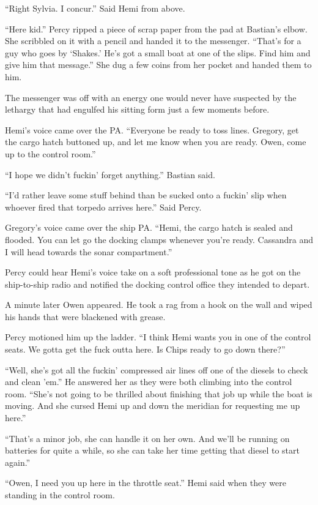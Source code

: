 \documentclass[
]{scrbook}
\begin{document}
``Right Sylvia. I concur.'' Said Hemi from above.

``Here kid.'' Percy ripped a piece of scrap paper from the pad at
Bastian's elbow. She scribbled on it with a pencil and handed it to the
messenger. ``That's for a guy who goes by `Shakes.' He's got a small
boat at one of the slips. Find him and give him that message.'' She dug
a few coins from her pocket and handed them to him.

The messenger was off with an energy one would never have suspected by
the lethargy that had engulfed his sitting form just a few moments
before.

Hemi's voice came over the PA. ``Everyone be ready to toss lines.
Gregory, get the cargo hatch buttoned up, and let me know when you are
ready. Owen, come up to the control room.''

``I hope we didn't fuckin' forget anything.'' Bastian said.

``I'd rather leave some stuff behind than be sucked onto a fuckin' slip
when whoever fired that torpedo arrives here.'' Said Percy.

Gregory's voice came over the ship PA. ``Hemi, the cargo hatch is sealed
and flooded. You can let go the docking clamps whenever you're ready.
Cassandra and I will head towards the sonar compartment.''

Percy could hear Hemi's voice take on a soft professional tone as he got
on the ship-to-ship radio and notified the docking control office they
intended to depart.

A minute later Owen appeared. He took a rag from a hook on the wall and
wiped his hands that were blackened with grease.

Percy motioned him up the ladder. ``I think Hemi wants you in one of the
control seats. We gotta get the fuck outta here. Is Chips ready to go
down there?''

``Well, she's got all the fuckin' compressed air lines off one of the
diesels to check and clean 'em.'' He answered her as they were both
climbing into the control room. ``She's not going to be thrilled about
finishing that job up while the boat is moving. And she cursed Hemi up
and down the meridian for requesting me up here.''

``That's a minor job, she can handle it on her own. And we'll be running
on batteries for quite a while, so she can take her time getting that
diesel to start again.''

``Owen, I need you up here in the throttle seat.'' Hemi said when they
were standing in the control room.
\end{document}
